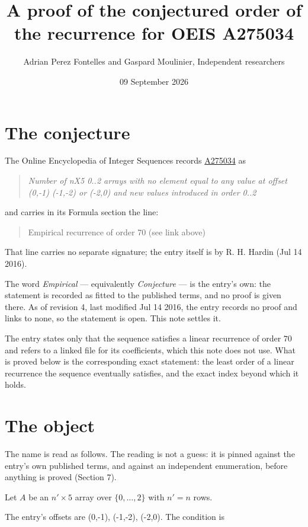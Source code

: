 \documentclass[11pt]{article}
\title{A proof of the conjectured order of the recurrence for OEIS A275034}
\author{Adrian Perez Fontelles and Gaspard Moulinier, Independent researchers}
\date{09 September 2026}
\theoremstyle{definition}
\begin{document}
\maketitle
\section{The conjecture}

The Online Encyclopedia of Integer Sequences records \href{https://oeis.org/A275034}{A275034} as

\begin{quote}\itshape Number of nX5 0..2 arrays with no element equal to any value at offset (0,-1) (-1,-2) or (-2,0) and new values introduced in order 0..2\end{quote}

and carries in its Formula section the line:

\begin{quote}\ttfamily Empirical recurrence of order 70 (see link above)\end{quote}

That line carries no separate signature; the entry itself is by R. H. Hardin (Jul 14 2016).

The word {\itshape Empirical} --- equivalently {\itshape Conjecture} --- is the entry's own: the statement is recorded as fitted to the published terms, and no proof is given there. As of revision 4, last modified Jul 14 2016, the entry records no proof and links to none, so the statement is open. This note settles it.

The entry states only that the sequence satisfies a linear recurrence of order $70$ and refers to a linked file for its coefficients, which this note does not use. What is proved below is the corresponding exact statement: the least order of a linear recurrence the sequence eventually satisfies, and the exact index beyond which it holds.

\section{The object}

The name is read as follows. The reading is not a guess: it is pinned against the entry's own published terms, and against an independent enumeration, before anything is proved (Section 7).

Let $A$ be an $n' \times 5$ array over $\{0,\dots,2\}$ with $n' = n$ rows.

The entry's offsets are (0,-1), (-1,-2), (-2,0). The condition is
\end{document}
